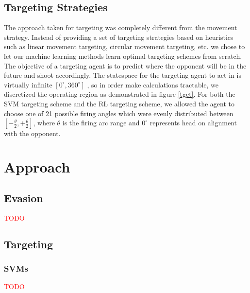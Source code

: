 \documentclass{article}
\newcommand{\xxx}[1]{\textcolor{red}{#1}}
\theoremstyle{plain}
\theoremstyle{definition}
\theoremstyle{remark}
\begin{document}
\subsection*{Targeting Strategies}
The approach taken for targeting was completely different from the movement strategy. Instead of providing a set of targeting strategies based on heuristics such as linear movement targeting, circular movement targeting, etc. we chose to let our machine learning methods learn optimal targeting schemes from scratch. The objective of a targeting agent is to predict where the opponent will be in the future and shoot accordingly. The statespace for the targeting agent to act in is virtually infinite $[0^{\circ}, 360^{\circ}]$ , so in order make calculations tractable, we discretized the operating region as demonstrated in figure \ref{tget}. For both the SVM targeting scheme and the RL targeting scheme, we allowed the agent to choose one of 21 possible firing angles which were evenly distributed between $[-\frac{\theta}{2}, +\frac{\theta}{2}]$, where $\theta$ is the firing arc range and $0^{\circ}$ represents head on alignment with the opponent.



\section{Approach}

\subsection*{Evasion}

\xxx{TODO}

\subsection*{Targeting}


\subsubsection*{SVMs}

\xxx{TODO}
\end{document}
